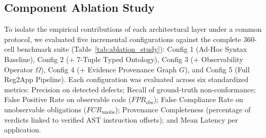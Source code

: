 \subsection{Component Ablation Study}
\label{sec:benchmark:ablation}

To isolate the empirical contributions of each architectural layer under a common protocol, we evaluated five incremental configurations against the complete 360-cell benchmark suite (Table~\ref{tab:ablation_study}): Config 1 (Ad-Hoc Syntax Baseline), Config 2 (+ 7-Tuple Typed Ontology), Config 3 (+ Observability Operator $\Omega$), Config 4 (+ Evidence Provenance Graph $G$), and Config 5 (Full Reg2App Pipeline). Each configuration was evaluated across six standardized metrics: Precision on detected defects; Recall of ground-truth non-conformance; False Positive Rate on observable code ($FPR_{\text{obs}}$); False Compliance Rate on unobservable obligations ($FCR_{\text{unobs}}$); Provenance Completeness (percentage of verdicts linked to verified AST instruction offsets); and Mean Latency per application.

\begin{table}[b]
\small
\caption{Architectural Ablation Study Across Verification Layers Evaluated on the Common 360-Cell Ground-Truth Benchmark Suite}
\label{tab:ablation_study}
\centering
{}
\end{table}

